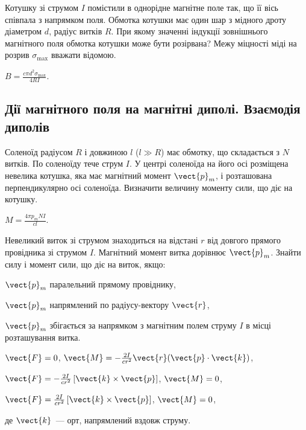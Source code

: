 \begin{problem}
Котушку зі струмом $I$ помістили в однорідне магнітне поле так, що її вісь співпала з напрямком поля. Обмотка котушки має один шар з мідного дроту діаметром $d$, радіус витків $R$. При якому значенні індукції зовнішнього магнітного поля обмотка котушки може бути розірвана? Межу міцності міді на розрив $\sigma_{\max}$ вважати відомою.
\begin{solution}
	$B = \frac{c\pi d^2 \sigma_{\max}}{4RI}$.
\end{solution}
\end{problem}

\subsection*{Дії магнітного поля на магнітні диполі. Взаємодія диполів}
\begin{problem}
Соленоїд радіусом $R$ і довжиною $l$ ($l \gg R$) має обмотку, що складається з $N$ витків. По соленоїду тече струм $I$. У центрі соленоїда на його осі розміщена невелика котушка, яка має магнітний момент $\vect{p}_m$, і розташована перпендикулярно осі соленоїда. Визначити величину моменту сили, що діє на котушку.
\begin{solution}
	$M = \frac{4\pi p_m NI}{cl}$.
\end{solution}
\end{problem}

\begin{problem}
Невеликий виток зі струмом знаходиться на відстані $r$ від довгого прямого провідника зі струмом $I$. Магнітний момент витка дорівнює $\vect{p}_m$. Знайти силу і момент сили, що діє на виток, якщо:
\begin{enumerate*}[label=\alph*)]
	\item $\vect{p}_m$ паралельний прямому провіднику,
	\item $\vect{p}_m$ напрямлений по радіусу-вектору $\vect{r}$,
	\item $\vect{p}_m$ збігається за напрямком з магнітним полем струму $I$ в місці розташування витка.
\end{enumerate*}
\begin{solution}
	\begin{enumerate*}[label=\alph*)]
		\item $\vect{F} = 0$, $\vect{M} = - \frac{2I}{cr^2} \vect{r} (\vect{p} \cdot \vect{k})$,
		\item $\vect{F} = - \frac{2I}{cr^2} \left[ \vect{k} \times \vect{p}\right]$, $\vect{M} = 0$,
		\item $\vect{F} = \frac{2I}{cr^2} \left[ \vect{k} \times \vect{p}\right]$, $\vect{M} = 0$,
	\end{enumerate*}
	де $\vect{k}$~--- орт, напрямлений вздовж струму.
\end{solution}
\end{problem}

